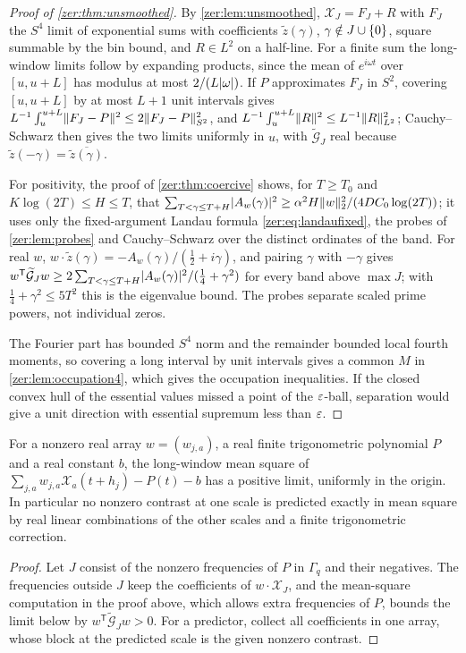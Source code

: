 \begin{proof}[Proof of \cref{zer:thm:unsmoothed}]
By \cref{zer:lem:unsmoothed}, $\mathcal X_J=F_J+R$ with $F_J$ the $S^4$ limit of exponential sums with
coefficients $\widetilde z(\gamma)$, $\gamma\notin J\cup\{0\}$, square summable by the bin bound, and
$R\in L^2$ on a half-line. For a finite sum the long-window limits follow by expanding products,
since the mean of $e^{i\omega t}$ over $[u,u+L]$ has modulus at most $2/(L\lvert\omega\rvert)$. If $P$
approximates $F_J$ in $S^2$, covering $[u,u+L]$ by at most $L+1$ unit intervals gives
$L^{-1}\int_u^{u+L}\lVert F_J-P\rVert^2\le2\lVert F_J-P\rVert_{S^2}^2$, and $L^{-1}\int_u^{u+L}\lVert R\rVert^2\le
L^{-1}\lVert R\rVert_{L^2}^2$; Cauchy--Schwarz then gives the two limits uniformly in $u$, with
$\widetilde{\mathcal G}_J$ real because $\widetilde z(-\gamma)=\overline{\widetilde z(\gamma)}$.

For positivity, the proof of \cref{zer:thm:coercive} shows, for $T\ge T_0$ and $K\log(2T)\le H\le T$,
that $\sum_{T<\gamma\le T+H}\lvert A_w(\gamma)\rvert^2\ge\alpha^2H\lVert w\rVert_2^2/(4DC_0\log(2T))$; it uses only the
fixed-argument Landau formula \eqref{zer:eq:landaufixed}, the probes of \cref{zer:lem:probes} and
Cauchy--Schwarz over the distinct ordinates of the band. For real $w$,
$w\cdot\widetilde z(\gamma)=-A_w(\gamma)/(\tfrac12+i\gamma)$, and pairing $\gamma$ with $-\gamma$ gives
$w^{\mathsf T}\widetilde{\mathcal G}_Jw\ge2\sum_{T<\gamma\le T+H}\lvert A_w(\gamma)\rvert^2/(\tfrac14+\gamma^2)$ for
every band above $\max J$; with $\tfrac14+\gamma^2\le5T^2$ this is the eigenvalue bound. The probes
separate scaled prime powers, not individual zeros.

The Fourier part has bounded $S^4$ norm and the remainder bounded local fourth moments, so covering a
long interval by unit intervals gives a common $M$ in \cref{zer:lem:occupation4}, which gives the
occupation inequalities. If the closed convex hull of the essential values missed a point of the
$\varepsilon$-ball, separation would give a unit direction with essential supremum less than $\varepsilon$.
\end{proof}

\begin{corollary}\label{zer:cor:unsmoothedpred}
For a nonzero real array $w=(w_{j,a})$, a real finite trigonometric polynomial $P$ and a real
constant $b$, the long-window mean square of $\sum_{j,a}w_{j,a}\mathcal X_a(t+h_j)-P(t)-b$ has a
positive limit, uniformly in the origin. In particular no nonzero contrast at one scale is predicted
exactly in mean square by real linear combinations of the other scales and a finite trigonometric
correction.
\end{corollary}
\begin{proof}
Let $J$ consist of the nonzero frequencies of $P$ in $\Gamma_q$ and their negatives. The frequencies
outside $J$ keep the coefficients of $w\cdot\mathcal X_J$, and the mean-square computation in the proof
above, which allows extra frequencies of $P$, bounds the limit below by
$w^{\mathsf T}\widetilde{\mathcal G}_Jw>0$. For a predictor, collect all coefficients in one array, whose
block at the predicted scale is the given nonzero contrast.
\end{proof}

